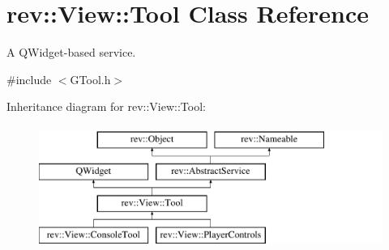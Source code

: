\hypertarget{classrev_1_1_view_1_1_tool}{}\section{rev\+::View\+::Tool Class Reference}
\label{classrev_1_1_view_1_1_tool}


A Q\+Widget-\/based service.  




{\ttfamily \#include $<$G\+Tool.\+h$>$}

Inheritance diagram for rev\+::View\+::Tool\+:\begin{figure}[H]
\begin{center}
\leavevmode
\includegraphics[height=4.000000cm]{classrev_1_1_view_1_1_tool}
\end{center}
\end{figure}
